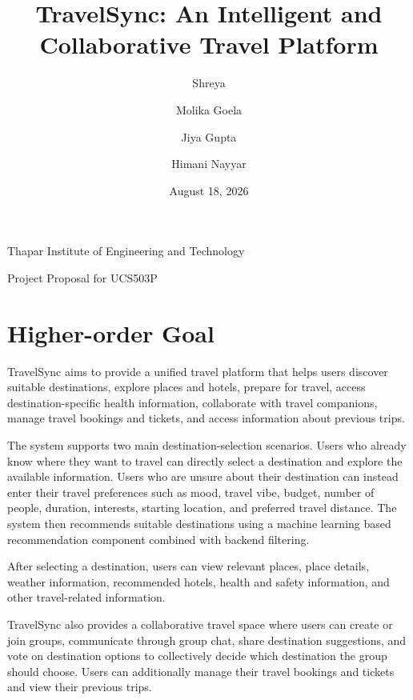 \documentclass[11pt,a4paper]{article}
\title{TravelSync: An Intelligent and Collaborative Travel Platform}
\author{
    Shreya
    \and
    Molika Goela
    \and
    Jiya Gupta
    \and
    Himani Nayyar
}
\date{August 18, 2026}
\begin{document}
\maketitle

\begin{center}
\large
Thapar Institute of Engineering and Technology
\end{center}

\vspace{0.5em}

\begin{center}
\large
Project Proposal for UCS503P
\end{center}

\vspace{1em}



\section{Higher-order Goal}

TravelSync aims to provide a unified travel platform that helps users discover suitable destinations, explore places and hotels, prepare for travel, access destination-specific health information, collaborate with travel companions, manage travel bookings and tickets, and access information about previous trips.

The system supports two main destination-selection scenarios. Users who already know where they want to travel can directly select a destination and explore the available information. Users who are unsure about their destination can instead enter their travel preferences such as mood, travel vibe, budget, number of people, duration, interests, starting location, and preferred travel distance. The system then recommends suitable destinations using a machine learning based recommendation component combined with backend filtering.

After selecting a destination, users can view relevant places, place details, weather information, recommended hotels, health and safety information, and other travel-related information.

TravelSync also provides a collaborative travel space where users can create or join groups, communicate through group chat, share destination suggestions, and vote on destination options to collectively decide which destination the group should choose. Users can additionally manage their travel bookings and tickets and view their previous trips.
\end{document}
